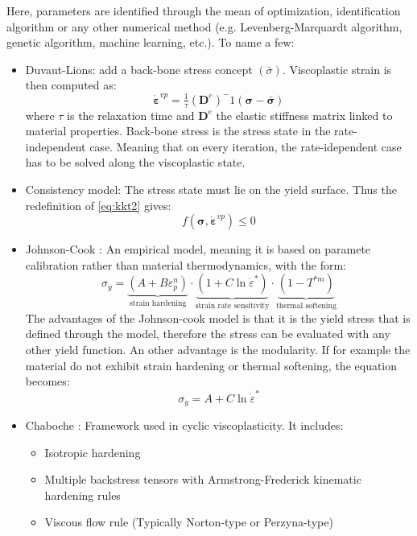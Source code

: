 \documentclass[final,5p,times,twocolumn]{elsarticle}
\begin{document}
Here, parameters are identified through the mean of optimization, identification algorithm or any other numerical method (e.g. Levenberg-Marquardt algorithm, genetic algorithm, machine learning, etc.). To name a few:
\begin{itemize}
  \item Duvaut-Lions: add a back-bone stress concept $(\bar{\sigma})$. Viscoplastic strain is then computed as:
  \begin{equation}
    \boldsymbol{\dot{\varepsilon}}^{vp} = \tfrac{1}{\tau}\left( \boldsymbol{D}^e\right)^-1(\boldsymbol{\sigma} - \boldsymbol{\bar{\sigma}})
  \end{equation}
  where $\tau$ is the relaxation time and $\boldsymbol{D}^e$ the elastic stiffness matrix linked to material properties. Back-bone stress is the stress state in the rate-independent case. Meaning that on every iteration, the rate-idependent case has to be solved along the viscoplastic state.
  
  \item Consistency model: The stress state must lie on the yield surface. Thus the redefinition of \cref{eq:kkt2} gives:
  \begin{equation}
    f(\boldsymbol{\sigma},\boldsymbol{\dot{\varepsilon}}^{vp}) \leq 0
  \end{equation}
  \item Johnson-Cook \cite{Johnson1983}: An empirical model, meaning it is based on paramete calibration rather than material thermodynamics, with the form:
  \begin{equation}
    \sigma_y = \underbrace{(A + B \varepsilon_p^n)}_{\text{strain hardening}} \cdot \underbrace{(1 + C \ln \dot{\varepsilon}^*)}_{\text{strain rate sensitivity}} \cdot \underbrace{(1 - T^{*m})}_{\text{thermal softening}}
  \end{equation}
   The advantages of the Johnson-cook model is that it is the yield stress that is defined through the model, therefore the stress can be evaluated with any other yield function. An other advantage is the modularity. If for example the material do not exhibit strain hardening or thermal softening, the equation becomes:
  \begin{equation}
    \sigma_y = A + C \ln \dot{\varepsilon}^*
  \end{equation}
  \item Chaboche \cite{Chaboche1986}: Framework used in cyclic viscoplasticity. It includes:
  \begin{itemize}
    \item Isotropic hardening
    \item Multiple backstress tensors with Armstrong-Frederick kinematic hardening rules
    \item Viscous flow rule (Typically Norton-type or Perzyna-type)
  \end{itemize}   
  
\end{itemize}
\end{document}

